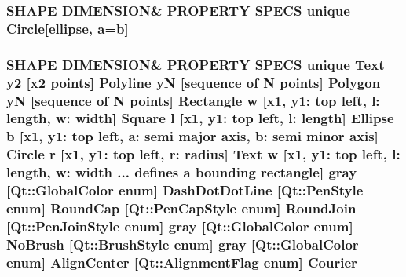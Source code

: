 \subsubsection[{\texorpdfstring{Circle}{Circle}}]{\setlength{\rightskip}{0pt plus 5cm}S\+H\+A\+PE D\+I\+M\+E\+N\+S\+I\+ON\& P\+R\+O\+P\+E\+R\+TY S\+P\+E\+CS unique {\bf Circle}\mbox{[}ellipse, {\bf a}=b\mbox{]}}\hypertarget{shape__input__file__specs_8txt_af42de4b736c5bed215a1faf053c5ef86}{}\label{shape__input__file__specs_8txt_af42de4b736c5bed215a1faf053c5ef86}
\subsubsection[{\texorpdfstring{Courier}{Courier}}]{\setlength{\rightskip}{0pt plus 5cm}S\+H\+A\+PE D\+I\+M\+E\+N\+S\+I\+ON\& P\+R\+O\+P\+E\+R\+TY S\+P\+E\+CS unique {\bf Text} {\bf y2} \mbox{[}{\bf x2} points\mbox{]} {\bf Polyline} yN \mbox{[}sequence of N points\mbox{]} {\bf Polygon} yN \mbox{[}sequence of N points\mbox{]} {\bf Rectangle} w \mbox{[}{\bf x1}, y1\+: top left, l\+: length, w\+: width\mbox{]} {\bf Square} {\bf l} \mbox{[}{\bf x1}, y1\+: top left, l\+: length\mbox{]} {\bf Ellipse} b \mbox{[}{\bf x1}, y1\+: top left, a\+: semi major axis, b\+: semi minor axis\mbox{]} {\bf Circle} r \mbox{[}{\bf x1}, y1\+: top left, r\+: radius\mbox{]} {\bf Text} w \mbox{[}{\bf x1}, y1\+: top left, l\+: length, w\+: width ... defines {\bf a} bounding rectangle\mbox{]} gray \mbox{[}Qt\+::\+Global\+Color enum\mbox{]} Dash\+Dot\+Dot\+Line \mbox{[}Qt\+::\+Pen\+Style enum\mbox{]} Round\+Cap \mbox{[}{\bf Qt\+::\+Pen\+Cap\+Style} enum\mbox{]} Round\+Join \mbox{[}{\bf Qt\+::\+Pen\+Join\+Style} enum\mbox{]} gray \mbox{[}Qt\+::\+Global\+Color enum\mbox{]} No\+Brush \mbox{[}{\bf Qt\+::\+Brush\+Style} enum\mbox{]} gray \mbox{[}Qt\+::\+Global\+Color enum\mbox{]} Align\+Center \mbox{[}Qt\+::\+Alignment\+Flag enum\mbox{]} Courier}\hypertarget{shape__input__file__specs_8txt_aa5d9b1deea09aad740806cc98f7cc740}{}\label{shape__input__file__specs_8txt_aa5d9b1deea09aad740806cc98f7cc740}
